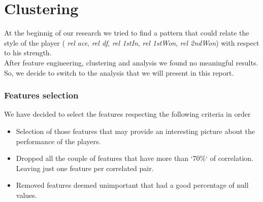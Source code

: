 \section{Clustering}
At the beginnig of our research we tried to find a pattern that could relate the style of the player ( \textit{rel ace},  \textit{rel df},  \textit{rel 1stIn},  \textit{rel 1stWon},  \textit{rel 2ndWon}) with respect to his strength.\\ After feature engineering, clustering and analysis we found no meaningful results. So, we decide to switch to the analysis that we will present in this report.

\subsubsection{Features selection}
We have decided to select the features respecting the following criteria in order
\begin{itemize}
    \item Selection of those features that may provide an interesting picture about the performance of the players.
    \item Dropped all the couple of features that have more than `70\%` of correlation. Leaving just one feature per correlated pair.
    \item Removed features deemed unimportant that had a good percentage of null values.
\end{itemize}

